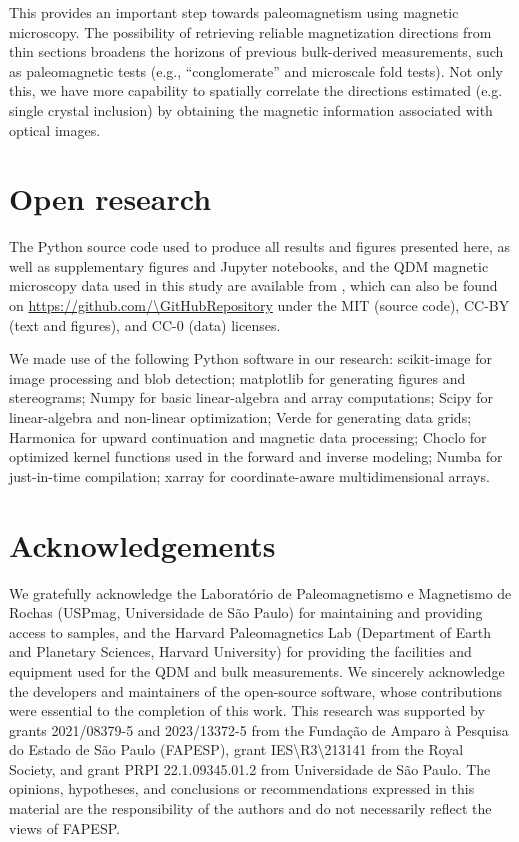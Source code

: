 This provides an important step towards paleomagnetism using magnetic microscopy. The possibility of retrieving reliable magnetization directions from thin sections broadens the horizons of previous bulk-derived measurements, such as paleomagnetic tests (e.g., ``conglomerate'' and microscale fold tests). Not only this, we have more capability to spatially correlate the directions estimated (e.g. single crystal inclusion) by obtaining the magnetic information associated with optical images.


\section{Open research}

The Python source code used to produce all results and figures presented here, as well as supplementary figures and Jupyter notebooks, and the QDM magnetic microscopy data used in this study are available from \citet{figshare}, which can also be found on \url{https://github.com/\GitHubRepository} under the MIT (source code), CC-BY (text and figures), and CC-0 (data) licenses.

We made use of the following Python software in our research:
scikit-image \citep{VanderWalt2014} for image processing and blob detection;
matplotlib \citep{Hunter2007} for generating figures and stereograms;
Numpy \citep{Harris2020} for basic linear-algebra and array computations;
Scipy \citep{2020SciPy-NMeth} for linear-algebra and non-linear optimization;
Verde \citep{verde2018} for generating data grids;
Harmonica \citep{harmonica2020} for upward continuation and magnetic data processing;
Choclo \citep{choclo2022} for optimized kernel functions used in the
forward and inverse modeling;
Numba \citep{lam2015numba} for just-in-time compilation;
xarray \citep{hoyer2017xarray} for coordinate-aware multidimensional arrays.

\section{Acknowledgements}

We gratefully acknowledge the Laboratório de Paleomagnetismo e Magnetismo de Rochas (USPmag, Universidade de São Paulo) for maintaining and providing access to samples, and the Harvard Paleomagnetics Lab (Department of Earth and Planetary Sciences, Harvard University) for providing the facilities and equipment used for the QDM and bulk measurements. We sincerely acknowledge the developers and maintainers of the open-source software, whose contributions were essential to the completion of this work. This research was supported by grants 2021/08379-5 and 2023/13372-5 from the Fundação de Amparo à Pesquisa do Estado de São Paulo (FAPESP), grant IES\textbackslash{}R3\textbackslash{}213141 from the Royal Society, and grant PRPI 22.1.09345.01.2 from Universidade de São Paulo.
The opinions, hypotheses, and conclusions or recommendations expressed in this material are the responsibility of the authors and do not necessarily reflect the views of FAPESP.


